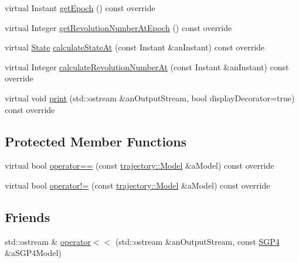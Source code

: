 \begin{DoxyCompactItemize}
\item 
virtual Instant \hyperlink{classlibrary_1_1astro_1_1trajectory_1_1orbit_1_1models_1_1_s_g_p4_a44439cf23b0d6d7b726b5b9c8784b5c1}{get\+Epoch} () const override
\item 
virtual Integer \hyperlink{classlibrary_1_1astro_1_1trajectory_1_1orbit_1_1models_1_1_s_g_p4_ac4b0a82cff7908a0192b7e2db3107f13}{get\+Revolution\+Number\+At\+Epoch} () const override
\item 
virtual \hyperlink{classlibrary_1_1astro_1_1trajectory_1_1_state}{State} \hyperlink{classlibrary_1_1astro_1_1trajectory_1_1orbit_1_1models_1_1_s_g_p4_a5d94d349c464f7313017c795a9346084}{calculate\+State\+At} (const Instant \&an\+Instant) const override
\item 
virtual Integer \hyperlink{classlibrary_1_1astro_1_1trajectory_1_1orbit_1_1models_1_1_s_g_p4_af1591139c936dd0c696972e5cb461009}{calculate\+Revolution\+Number\+At} (const Instant \&an\+Instant) const override
\item 
virtual void \hyperlink{classlibrary_1_1astro_1_1trajectory_1_1orbit_1_1models_1_1_s_g_p4_aca7d5615c14d59338506fb13630cd535}{print} (std\+::ostream \&an\+Output\+Stream, bool display\+Decorator=true) const override
\end{DoxyCompactItemize}
\subsection*{Protected Member Functions}
\begin{DoxyCompactItemize}
\item 
virtual bool \hyperlink{classlibrary_1_1astro_1_1trajectory_1_1orbit_1_1models_1_1_s_g_p4_a6210273bf78e8b98b310999a09d89cc4}{operator==} (const \hyperlink{classlibrary_1_1astro_1_1trajectory_1_1_model}{trajectory\+::\+Model} \&a\+Model) const override
\item 
virtual bool \hyperlink{classlibrary_1_1astro_1_1trajectory_1_1orbit_1_1models_1_1_s_g_p4_addbc5d1289986a6f89da00a21d4ab8e6}{operator!=} (const \hyperlink{classlibrary_1_1astro_1_1trajectory_1_1_model}{trajectory\+::\+Model} \&a\+Model) const override
\end{DoxyCompactItemize}
\subsection*{Friends}
\begin{DoxyCompactItemize}
\item 
std\+::ostream \& \hyperlink{classlibrary_1_1astro_1_1trajectory_1_1orbit_1_1models_1_1_s_g_p4_a44bd6a41f5d1be384d07b897785529f1}{operator$<$$<$} (std\+::ostream \&an\+Output\+Stream, const \hyperlink{classlibrary_1_1astro_1_1trajectory_1_1orbit_1_1models_1_1_s_g_p4}{S\+G\+P4} \&a\+S\+G\+P4\+Model)
\end{DoxyCompactItemize}


